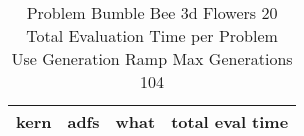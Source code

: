 \begin{table}[H]
\caption{Problem  Bumble Bee 3d  Flowers 20\\Total Evaluation Time per Problem \\ Use Generation Ramp  Max Generations 104\\}
\begin{center}
\scalebox{1.0} %
{
\begin{tabular}{lllr}
\hline
kern & adfs & what & total eval time \\
\hline


\end{tabular}
}
\end{center}
\end{table}

